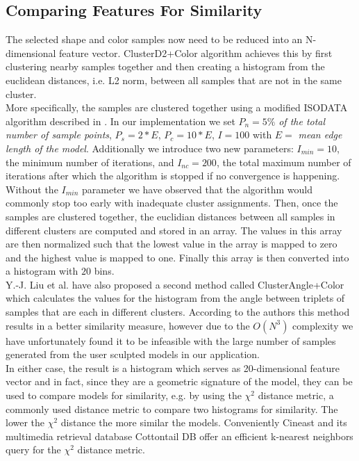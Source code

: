 \subsection{Comparing Features For Similarity}

The selected shape and color samples now need to be reduced into an N-dimensional feature vector. ClusterD2+Color algorithm achieves this by first clustering nearby samples together and then
creating a histogram from the euclidean distances, i.e. L2 norm, between all samples that are not in the same cluster.\\
More specifically, the samples are clustered together using a modified
ISODATA algorithm described in \cite{cluster_d2_color}. In our implementation we set $P_n = 5\%$ \textit{of the total number of sample points}, $P_s = 2 * E$, $P_c = 10 * E$, $I = 100$ with $E =$ \textit{mean edge length of the model}.
Additionally we introduce two new parameters: $I_{min} = 10$, the minimum number of iterations, and $I_{nc} = 200$, the total maximum number of iterations after which the algorithm is stopped if no convergence is happening. Without
the $I_{min}$ parameter we have observed that the algorithm would commonly stop too early with inadequate cluster assignments. Then, once the samples are clustered together, the euclidian distances between all samples in different clusters
are computed and stored in an array. The values in this array are then normalized such that the lowest value in the array is mapped to zero and the highest value is mapped to one. Finally this array is then converted into a histogram with $20$ bins.\\
Y.-J. Liu et al. \cite{cluster_d2_color} have also proposed a second method called ClusterAngle+Color which calculates the values for the histogram from the angle between triplets of samples that are each in different clusters. According
to the authors this method results in a better similarity measure, however due to the $O(N^3)$ complexity we have unfortunately found it to be infeasible with the large number of samples generated from the user sculpted models in our application.\\
In either case, the result is a histogram which serves as 20-dimensional feature vector and in fact, since they are a geometric signature of the model, they can be used to compare models for similarity,
e.g. by using the $\chi^2$ distance metric, a commonly used distance metric to compare two histograms for similarity. The lower the $\chi^2$ distance the more similar the models. Conveniently Cineast and its multimedia retrieval
database Cottontail DB offer an efficient k-nearest neighbors query for the $\chi^2$ distance metric.\\

